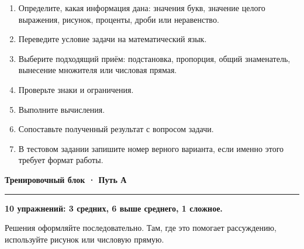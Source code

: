 \documentclass[a4paper,12pt]{article}
\newcommand{\sectiontitle}[1]{%
  \vspace{0.6em}%
  {\Large\bfseries\textcolor{darkaccent}{#1}}\par
  \vspace{0.25em}%
  {\color{linegray}\rule{\linewidth}{0.6pt}}\par
  \vspace{0.5em}%
}
\begin{document}
\begin{enumerate}

  \item
  Определите, какая информация дана:
  значения букв, значение целого выражения,
  рисунок, проценты, дроби или неравенство.

  \item
  Переведите условие задачи на математический язык.

  \item
  Выберите подходящий приём:
  подстановка, пропорция, общий знаменатель,
  вынесение множителя или числовая прямая.

  \item
  Проверьте знаки и ограничения.

  \item
  Выполните вычисления.

  \item
  Сопоставьте полученный результат с вопросом задачи.

  \item
  В тестовом задании запишите номер верного варианта,
  если именно этого требует формат работы.

\end{enumerate}


\clearpage

\sectiontitle{Тренировочный блок · Путь А}

\textbf{10 упражнений: 3 средних, 6 выше среднего, 1 сложное.}

Решения оформляйте последовательно.
Там, где это помогает рассуждению, используйте рисунок
или числовую прямую.
\end{document}
